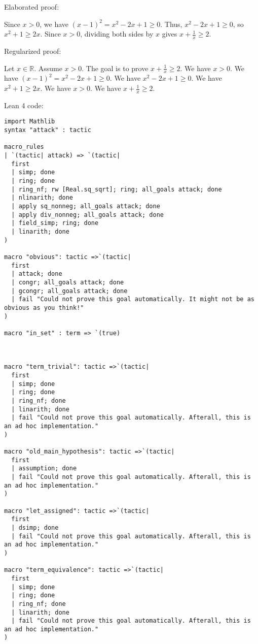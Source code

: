 \documentclass{article}
\begin{document}
Elaborated proof:
\begin{tcolorbox}[colback=green!10, width=\linewidth]
Since $x>0$, we have $(x-1)^2 = x^2 - 2x + 1 \ge 0$. Thus, $x^2 - 2x + 1 \ge 0$, so $x^2 + 1 \ge 2x$. Since $x > 0$, dividing both sides by $x$ gives $x + \frac{1}{x} \ge 2$.
\end{tcolorbox}

Regularized proof:
\begin{tcolorbox}[colback=red!10, width=\linewidth]
Let $x\in\mathbb{R}$.
Assume $x>0$.
The goal is to prove $x + \frac{1}{x} \ge 2$.
We have $x>0$.
We have ${{(x-1)}}^2 = x^2 - 2x + 1 \ge 0$.
We have $x^2 - 2x + 1 \ge 0$.
We have $x^2 + 1 \ge 2x$.
We have $x > 0$.
We have $x + \frac{1}{x} \ge 2$.
\end{tcolorbox}

Lean 4 code:
\begin{tcolorbox}[colback=white!10, width=\linewidth]
\begin{lstlisting}[language=Lean4]
import Mathlib
syntax "attack" : tactic

macro_rules
| `(tactic| attack) => `(tactic|
  first
  | simp; done
  | ring; done
  | ring_nf; rw [Real.sq_sqrt]; ring; all_goals attack; done
  | nlinarith; done
  | apply sq_nonneg; all_goals attack; done
  | apply div_nonneg; all_goals attack; done
  | field_simp; ring; done
  | linarith; done
)

macro "obvious": tactic =>`(tactic|
  first
  | attack; done
  | congr; all_goals attack; done
  | gcongr; all_goals attack; done
  | fail "Could not prove this goal automatically. It might not be as obvious as you think!"
)

macro "in_set" : term => `(true)



macro "term_trivial": tactic =>`(tactic|
  first
  | simp; done
  | ring; done
  | ring_nf; done
  | linarith; done
  | fail "Could not prove this goal automatically. Afterall, this is an ad hoc implementation."
)

macro "old_main_hypothesis": tactic =>`(tactic|
  first
  | assumption; done
  | fail "Could not prove this goal automatically. Afterall, this is an ad hoc implementation."
)

macro "let_assigned": tactic =>`(tactic|
  first
  | dsimp; done
  | fail "Could not prove this goal automatically. Afterall, this is an ad hoc implementation."
)

macro "term_equivalence": tactic =>`(tactic|
  first
  | simp; done
  | ring; done
  | ring_nf; done
  | linarith; done
  | fail "Could not prove this goal automatically. Afterall, this is an ad hoc implementation."
)


\end{lstlisting}
\end{tcolorbox}
\end{document}

